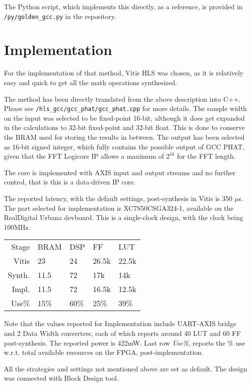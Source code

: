 \documentclass[a4paper,twocolumn]{article}
\begin{document}
The Python script, which implements this directly, as a reference, is
provided in \texttt{/py/golden\_gcc.py} in the repository.

\section{Implementation}

For the implementation of that method, Vitis HLS was chosen, as it is
relatively easy and quick to get all the math operations synthesized.

The method has been directly translated from the above description
into C++. Please see \texttt{/hls\_gcc/gcc\_phat/gcc\_phat.cpp} for
more details. The sample width on the input was selected to be
fixed-point 16-bit, although it does get expanded in the calculations
to 32-bit fixed-point and 32-bit float. This is done to conserve the
BRAM used for storing the results in between. The output has been
selected as 16-bit signed integer, which fully contains the possible
output of GCC PHAT, given that the FFT Logicore IP\cite{xfft} allows a
maximum of $2^{16}$ for the FFT length.

The core is implemented with AXIS input and output streams and no
further control, that is this is a data-driven IP core. 

The reported latency, with the default settings, post-synthesis
in Vitis is 350 $\mu$s. The part selected for implementation is
XC7S50CSGA324-1, available on the RealDigital Urbana devboard.
This is a single-clock design, with the clock being 100MHz.

\begin{tabular}{r|l|l|l|l}
  Stage & BRAM & DSP & FF & LUT \\
  Vitis & 23 & 24 & 26.5k & 22.5k \\
  Synth. & 11.5 & 72 & 17k & 14k \\
  Impl. & 11.5 & 72 & 16.5k & 12.5k \\
  Use\% & 15\% & 60\% & 25\% & 39\%
\end{tabular}

Note that the values reported for Implementation include UART-AXIS
bridge and 2 Data Width converters, each of which reports around 40
LUT and 60 FF post-synthesis. The reported power is 422mW. Last row
\emph{Use\%}, reports the \% use w.r.t. total available resources on
the FPGA, post-implementation.

All the strategies and settings not mentioned above are set as
default. The design was connected with Block Design tool.
\end{document}
